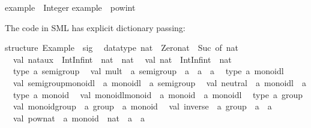 \begin{isabellebody}
\begin{isamarkuptext}
\isanewline
example\ {\isacharcolon}{\isacharcolon}\ Integer{\isacharsemicolon}\isanewline
example\ {\isacharequal}\ pow{\isacharunderscore}int\ {}{}\ {\isacharparenleft}{\isacharminus}{}{\isacharparenright}{\isacharsemicolon}\isanewline
\isanewline
{\isacharbraceright}\isanewline%
\end{isamarkuptext}%
\isamarkuptrue%
%
\endisatagquotetypewriter
{\isafoldquotetypewriter}%
%
\isadelimquotetypewriter
%
\endisadelimquotetypewriter
%
\begin{isamarkuptext}%
\noindent The code in SML has explicit dictionary passing:%
\end{isamarkuptext}%
\isamarkuptrue%
%
\isadelimquotetypewriter
%
\endisadelimquotetypewriter
%
\isatagquotetypewriter
%
\begin{isamarkuptext}%
structure\ Example\ {\isacharcolon}\ sig\isanewline
\ \ datatype\ nat\ {\isacharequal}\ Zero{\isacharunderscore}nat\ {\isacharbar}\ Suc\ of\ nat\isanewline
\ \ val\ nat{\isacharunderscore}aux\ {\isacharcolon}\ IntInf{\isachardot}int\ {\isacharminus}{\isachargreater}\ nat\ {\isacharminus}{\isachargreater}\ nat\isanewline
\ \ val\ nat\ {\isacharcolon}\ IntInf{\isachardot}int\ {\isacharminus}{\isachargreater}\ nat\isanewline
\ \ type\ {\isacharprime}a\ semigroup\isanewline
\ \ val\ mult\ {\isacharcolon}\ {\isacharprime}a\ semigroup\ {\isacharminus}{\isachargreater}\ {\isacharprime}a\ {\isacharminus}{\isachargreater}\ {\isacharprime}a\ {\isacharminus}{\isachargreater}\ {\isacharprime}a\isanewline
\ \ type\ {\isacharprime}a\ monoidl\isanewline
\ \ val\ semigroup{\isacharunderscore}monoidl\ {\isacharcolon}\ {\isacharprime}a\ monoidl\ {\isacharminus}{\isachargreater}\ {\isacharprime}a\ semigroup\isanewline
\ \ val\ neutral\ {\isacharcolon}\ {\isacharprime}a\ monoidl\ {\isacharminus}{\isachargreater}\ {\isacharprime}a\isanewline
\ \ type\ {\isacharprime}a\ monoid\isanewline
\ \ val\ monoidl{\isacharunderscore}monoid\ {\isacharcolon}\ {\isacharprime}a\ monoid\ {\isacharminus}{\isachargreater}\ {\isacharprime}a\ monoidl\isanewline
\ \ type\ {\isacharprime}a\ group\isanewline
\ \ val\ monoid{\isacharunderscore}group\ {\isacharcolon}\ {\isacharprime}a\ group\ {\isacharminus}{\isachargreater}\ {\isacharprime}a\ monoid\isanewline
\ \ val\ inverse\ {\isacharcolon}\ {\isacharprime}a\ group\ {\isacharminus}{\isachargreater}\ {\isacharprime}a\ {\isacharminus}{\isachargreater}\ {\isacharprime}a\isanewline
\ \ val\ pow{\isacharunderscore}nat\ {\isacharcolon}\ {\isacharprime}a\ monoid\ {\isacharminus}{\isachargreater}\ nat\ {\isacharminus}{\isachargreater}\ {\isacharprime}a\ {\isacharminus}{\isachargreater}\ {\isacharprime}a\isanewline

\end{isamarkuptext}
\end{isabellebody}
